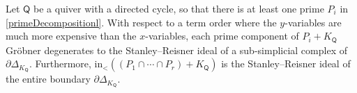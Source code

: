 \documentclass[ALCO,published]{cedram}
\numberwithin{equation}{section}
\newcommand{\1}{^{-1}}
\def\Q{\mathsf{Q}}
\begin{document}
\begin{prop}\label{prop:boundarySphere}
Let $\Q$ be a quiver with a directed cycle, so that there is at least one prime $P_i$ in \eqref{primeDecompositionl}.
With respect to a term order where the $y$-variables are much more expensive than the $x$-variables, each prime component of $P_i+K_\Q$ Gr\"obner degenerates to the Stanley--Reisner ideal of a sub-simplicial complex of $\partial \Delta_{K_\Q}$. 
Furthermore,
$\textrm{in}_< ((P_1\cap\cdots \cap P_r) + K_\Q)$ is the Stanley--Reisner ideal of the entire boundary $\partial \Delta_{K_\Q}$.
\end{prop}
\end{document}
